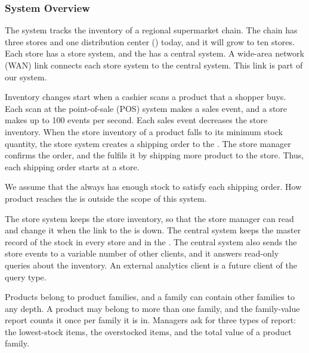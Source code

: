 \subsubsection{System Overview}
\label{sec:system-overview}

The system tracks the inventory of a regional supermarket chain. The chain has three
stores and one distribution center (\DC) today, and it will grow to ten stores. Each
store has a store system, and the \DC has a central system. A wide-area network (WAN)
link connects each store system to the central system. This link is part of our system.

Inventory changes start when a cashier scans a product that a shopper buys. Each scan at
the point-of-sale (POS) system makes a sales event, and a store makes up to 100 events
per second. Each sales event decreases the store inventory. When the store inventory of a
product falls to its minimum stock quantity, the store system creates a shipping order to
the \DC. The store manager confirms the order, and the \DC fulfils it by shipping more
product to the store. Thus, each shipping order starts at a store.

We assume that the \DC always has enough stock to satisfy each shipping order. How product
reaches the \DC is outside the scope of this system.

The store system keeps the store inventory, so that the store manager can read and change
it when the link to the \DC is down. The central system keeps the master record of the
stock in every store and in the \DC. The central system also sends the store events to a
variable number of other clients, and it answers read-only queries about the inventory. An
external analytics client is a future client of the query type.

Products belong to product families, and a family can contain other families to any
depth. A product may belong to more than one family, and the family-value report counts it
once per family it is in. Managers ask for three types of report: the lowest-stock items,
the overstocked items, and the total value of a product family.
